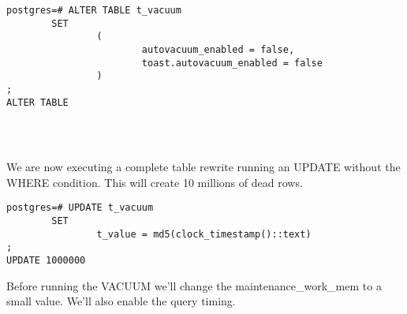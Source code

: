 \begin{lstlisting}[style=pgsql]
postgres=# ALTER TABLE t_vacuum
        SET
                (
                        autovacuum_enabled = false,
                        toast.autovacuum_enabled = false
                )
;
ALTER TABLE




\end{lstlisting}

We are now executing a complete table rewrite running an UPDATE without the WHERE condition.
This will create 10 millions of dead rows.\newline

\begin{lstlisting}[style=pgsql]
postgres=# UPDATE t_vacuum
        SET
                t_value = md5(clock_timestamp()::text)
;
UPDATE 1000000

\end{lstlisting}

Before running the VACUUM we'll change the maintenance\_work\_mem to a small value. We'll also enable the
query timing.\newline


